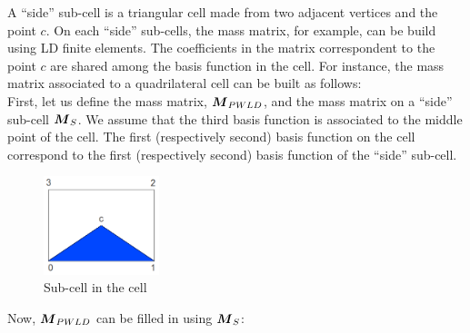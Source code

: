 A ``side'' sub-cell is a triangular cell made from two adjacent vertices and the 
point $c$. On each ``side'' sub-cells, the mass matrix, for example, can be build
using LD finite elements. The coefficients in the matrix correspondent to the 
point $c$ are shared among the basis function in the cell. For instance, the
mass matrix associated to a quadrilateral cell can be built as follows:\\
First, let us define the mass matrix, $\boldsymbol{M}_{PWLD}$, and the mass matrix on a 
``side'' sub-cell $\boldsymbol{M}_S$. We assume that the third basis function is associated 
to the middle point of the cell. The first (respectively second) basis function on 
the cell correspond to the first (respectively second) basis function of the 
``side'' sub-cell.
\begin{figure}[H]
  \centering
  \includegraphics[width=0.3\textwidth]{./Spatial_discretizations/mass_matrix}
  \caption{Sub-cell in the cell}
\end{figure}
Now, $\boldsymbol{M}_{PWLD}$ can be filled in using $\boldsymbol{M}_S$:
